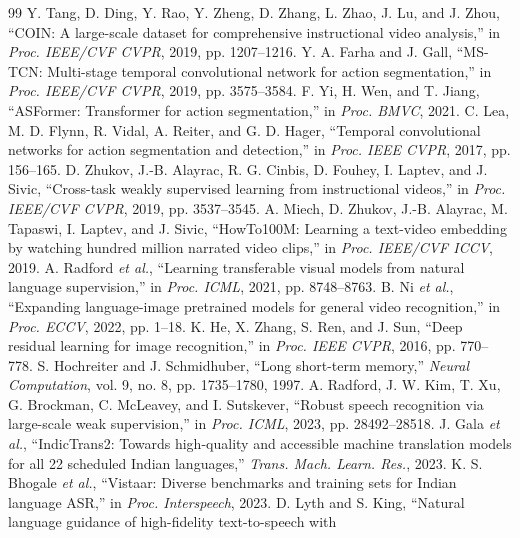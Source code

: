 \documentclass[conference]{IEEEtran}
\begin{document}
\begin{thebibliography}{99}
 Y. Tang, D. Ding, Y. Rao, Y. Zheng, D. Zhang, L. Zhao, J. Lu, and J. Zhou, ``COIN: A large-scale
dataset for comprehensive instructional video analysis,'' in \emph{Proc. IEEE/CVF CVPR}, 2019, pp. 1207--1216.
 Y. A. Farha and J. Gall, ``MS-TCN: Multi-stage temporal convolutional network for action
segmentation,'' in \emph{Proc. IEEE/CVF CVPR}, 2019, pp. 3575--3584.
 F. Yi, H. Wen, and T. Jiang, ``ASFormer: Transformer for action segmentation,'' in
\emph{Proc. BMVC}, 2021.
 C. Lea, M. D. Flynn, R. Vidal, A. Reiter, and G. D. Hager, ``Temporal convolutional networks for
action segmentation and detection,'' in \emph{Proc. IEEE CVPR}, 2017, pp. 156--165.
 D. Zhukov, J.-B. Alayrac, R. G. Cinbis, D. Fouhey, I. Laptev, and J. Sivic, ``Cross-task
weakly supervised learning from instructional videos,'' in \emph{Proc. IEEE/CVF CVPR}, 2019, pp. 3537--3545.
 A. Miech, D. Zhukov, J.-B. Alayrac, M. Tapaswi, I. Laptev, and J. Sivic, ``HowTo100M:
Learning a text-video embedding by watching hundred million narrated video clips,'' in \emph{Proc. IEEE/CVF ICCV}, 2019.
 A. Radford \emph{et al.}, ``Learning transferable visual models from natural language
supervision,'' in \emph{Proc. ICML}, 2021, pp. 8748--8763.
 B. Ni \emph{et al.}, ``Expanding language-image pretrained models for general video
recognition,'' in \emph{Proc. ECCV}, 2022, pp. 1--18.
 K. He, X. Zhang, S. Ren, and J. Sun, ``Deep residual learning for image recognition,'' in
\emph{Proc. IEEE CVPR}, 2016, pp. 770--778.
 S. Hochreiter and J. Schmidhuber, ``Long short-term memory,'' \emph{Neural Computation},
vol. 9, no. 8, pp. 1735--1780, 1997.
 A. Radford, J. W. Kim, T. Xu, G. Brockman, C. McLeavey, and I. Sutskever, ``Robust speech
recognition via large-scale weak supervision,'' in \emph{Proc. ICML}, 2023, pp. 28492--28518.
 J. Gala \emph{et al.}, ``IndicTrans2: Towards high-quality and accessible machine
translation models for all 22 scheduled Indian languages,'' \emph{Trans. Mach. Learn. Res.}, 2023.
 K. S. Bhogale \emph{et al.}, ``Vistaar: Diverse benchmarks and training sets for Indian
language ASR,'' in \emph{Proc. Interspeech}, 2023.
 D. Lyth and S. King, ``Natural language guidance of high-fidelity text-to-speech with

\end{thebibliography}
\end{document}
